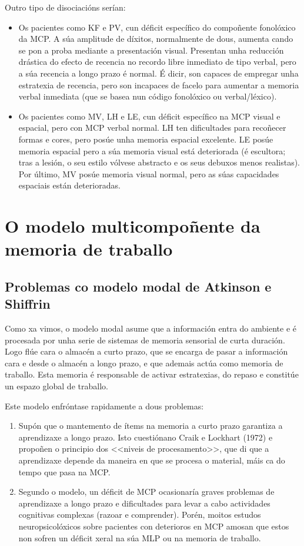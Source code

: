 \documentclass[a4paper,11pt]{article}
\begin{document}
Outro tipo de disociacións serían:
\begin{itemize}
	\item Os pacientes como KF e PV, cun déficit específico do compoñente fonolóxico da MCP. A súa
	amplitude de díxitos, normalmente de dous, aumenta cando se pon a proba mediante a presentación 		visual. Presentan unha reducción drástica do efecto de recencia no recordo libre inmediato de 			tipo verbal, pero a súa recencia a longo prazo é normal. É dicir, son capaces de empregar unha
	estratexia de recencia, pero son incapaces de facelo para aumentar a memoria verbal inmediata
	(que se basea nun código fonolóxico ou verbal/léxico).
	\item Os pacientes como MV, LH e LE, cun déficit específico na MCP visual e espacial, pero con 			MCP verbal normal. LH ten dificultades para recoñecer formas e cores, pero posúe unha memoria 			espacial excelente. LE posúe memoria espacial pero a súa memoria visual está deteriorada (é
	escultora; tras a lesión, o seu estilo vólvese abstracto e os seus debuxos menos realistas). Por
	último, MV posúe memoria visual normal, pero as súas capacidades espaciais están deterioradas. 
\end{itemize}

\section{O modelo multicompoñente da memoria de traballo}
\subsection{Problemas co modelo modal de Atkinson e Shiffrin}
Como xa vimos, o modelo modal asume que a información entra do ambiente e é procesada por unha serie de sistemas de memoria sensorial de curta duración. Logo flúe cara o almacén a curto prazo, que se encarga de pasar a información cara e desde o almacén a longo prazo, e que ademais actúa como memoria de traballo. Esta memoria é responsable de activar estratexias, do repaso e constitúe un espazo global de traballo. 

Este modelo enfróntase rapidamente a dous problemas:
\begin{enumerate}
	\item Supón que o mantemento de ítems na memoria a curto prazo garantiza a aprendizaxe a longo
	prazo. Isto cuestiónano Craik e Lockhart (1972) e propoñen o principio dos <<niveis de
	procesamento>>, que di que a aprendizaxe depende da maneira en que se procesa o material, máis
	ca do tempo que pasa na MCP.
	\item Segundo o modelo, un déficit de MCP ocasionaría graves problemas de aprendizaxe a longo
	prazo e dificultades para levar a cabo actividades cognitivas complexas (razoar e comprender).
	Porén, moitos estudos neuropsicolóxicos sobre pacientes con deterioros en MCP amosan que estos
	non sofren un déficit xeral na súa MLP ou na memoria de traballo.
\end{enumerate}
\end{document}
